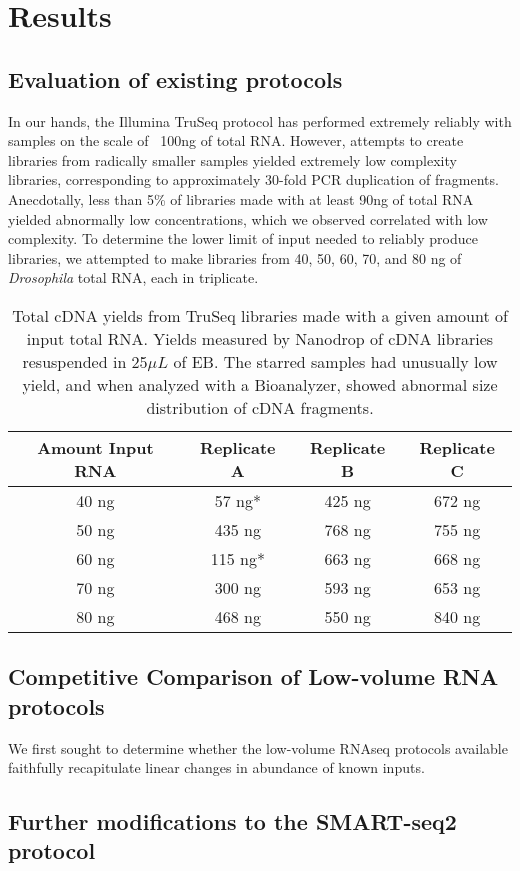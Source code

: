 \section{Results}


\subsection{Evaluation of existing protocols}


In our hands, the Illumina TruSeq protocol has performed extremely reliably with samples on the scale of ~100ng of total RNA.  However, attempts to create libraries from radically smaller samples yielded extremely low complexity libraries, corresponding to approximately 30-fold PCR duplication of fragments. Anecdotally, less than 5\% of libraries made with at least 90ng of total RNA yielded abnormally low concentrations, which we observed correlated with low complexity. To determine the lower limit of input needed to reliably produce libraries, we attempted to make libraries from 40, 50, 60, 70, and 80 ng of {\em Drosophila} total RNA, each in triplicate.


\begin{table}
\caption{Total cDNA yields from TruSeq libraries made with a given amount of input total RNA.  Yields measured by Nanodrop of cDNA libraries resuspended in 25$\mu L$ of EB. The starred samples had unusually low yield, and when analyzed with a Bioanalyzer, showed abnormal size distribution of cDNA fragments.}
\begin{center}
\begin{tabular}{|c|c|c|c|}\hline
Amount Input RNA & Replicate A & Replicate B & Replicate C\\\hline
40 ng &  57 ng*  & 425 ng & 672 ng\\
50 ng & 435 ng & 768 ng & 755 ng\\
60 ng & 115 ng* & 663 ng & 668 ng\\
70 ng & 300 ng & 593 ng & 653 ng\\
80 ng & 468 ng & 550 ng & 840 ng\\\hline
\end{tabular}
\end{center}
\label{default}
\end{table}


\subsection{Competitive Comparison of Low-volume RNA protocols}


We first sought to determine whether the low-volume RNAseq protocols available faithfully recapitulate linear changes in abundance of known inputs. 


\subsection{Further modifications to the SMART-seq2 protocol}
